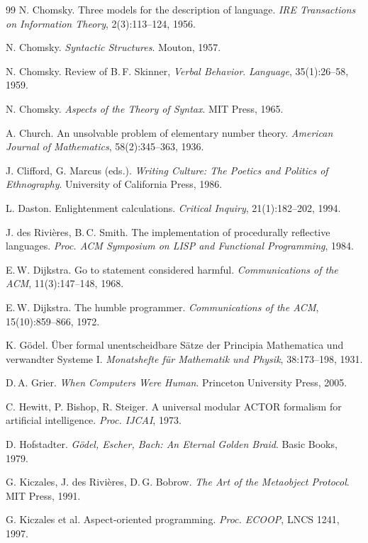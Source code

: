 \begin{thebibliography}{99}
N. Chomsky. Three models for the description of language.
\emph{IRE Transactions on Information Theory}, 2(3):113--124, 1956.

N. Chomsky. \emph{Syntactic Structures}. Mouton, 1957.

N. Chomsky. Review of B.\,F. Skinner, \emph{Verbal Behavior}.
\emph{Language}, 35(1):26--58, 1959.

N. Chomsky. \emph{Aspects of the Theory of Syntax}. MIT
Press, 1965.

A. Church. An unsolvable problem of elementary number theory.
\emph{American Journal of Mathematics}, 58(2):345--363, 1936.

J. Clifford, G. Marcus (eds.). \emph{Writing Culture: The
Poetics and Politics of Ethnography}. University of California Press, 1986.

L. Daston. Enlightenment calculations. \emph{Critical
Inquiry}, 21(1):182--202, 1994.

J. des Rivi\`eres, B.\,C. Smith. The implementation of
procedurally reflective languages. \emph{Proc. ACM Symposium on LISP and Functional
Programming}, 1984.

E.\,W. Dijkstra. Go to statement considered harmful.
\emph{Communications of the ACM}, 11(3):147--148, 1968.

E.\,W. Dijkstra. The humble programmer. \emph{Communications
of the ACM}, 15(10):859--866, 1972.

K. G\"odel. \"Uber formal unentscheidbare S\"atze der
Principia Mathematica und verwandter Systeme I. \emph{Monatshefte f\"ur Mathematik
und Physik}, 38:173--198, 1931.

D.\,A. Grier. \emph{When Computers Were Human}. Princeton
University Press, 2005.

C. Hewitt, P. Bishop, R. Steiger. A universal modular ACTOR
formalism for artificial intelligence. \emph{Proc. IJCAI}, 1973.

D. Hofstadter. \emph{G\"odel, Escher, Bach: An Eternal
Golden Braid}. Basic Books, 1979.

G. Kiczales, J. des Rivi\`eres, D.\,G. Bobrow. \emph{The Art
of the Metaobject Protocol}. MIT Press, 1991.

G. Kiczales et al. Aspect-oriented programming.
\emph{Proc. ECOOP}, LNCS 1241, 1997.


\end{thebibliography}
